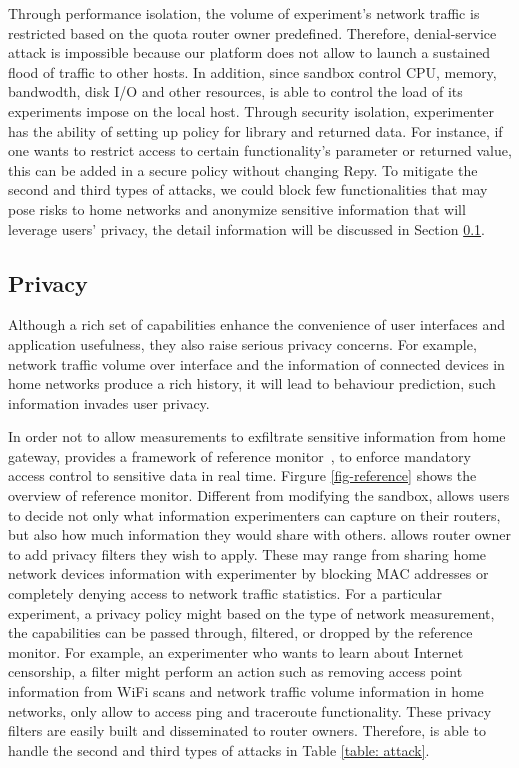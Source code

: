 Through performance isolation, the volume of experiment's network traffic is restricted based on the quota router owner predefined. Therefore, denial-service attack is impossible because our platform does not allow to launch a sustained flood of traffic to other hosts. In addition, since sandbox control CPU, memory, bandwodth, disk I/O and other resources, \sysname is able to control the load of its experiments impose on the local host. Through security isolation, experimenter has the ability of setting up policy for library and returned data. For instance, if one wants to restrict access to certain functionality's parameter or returned value, this can be added in a secure policy without changing Repy. To mitigate the second and third types of attacks, we could block few functionalities that may pose risks to home networks and anonymize sensitive information that will leverage users' privacy, the detail information will be discussed in Section \ref{sec.privacy}. 

\subsection{Privacy}
\label{sec.privacy}
Although a rich set of capabilities enhance the convenience of user interfaces and application usefulness, they also raise serious privacy concerns. For example, network traffic volume over interface and the information of connected devices in home networks produce a rich history, it will lead to behaviour prediction, such information invades user privacy. 

In order not to allow measurements to exfiltrate sensitive information from home gateway, \sysname provides a framework of reference monitor~\cite{ref}, to enforce mandatory access control to sensitive data in real time. Firgure \ref{fig-reference} shows the overview of reference monitor. Different from modifying the sandbox, \sysname allows users to decide not only what information experimenters can capture on their routers, but also how much information they would share with others. \sysname allows router owner to add privacy filters they wish to apply. These may range from sharing home network devices information with experimenter by blocking MAC addresses or completely denying access to network traffic statistics. For a particular experiment, a privacy policy might based on the type of network measurement, the capabilities can be passed through, filtered, or dropped by the reference monitor. For example, an experimenter who wants to learn about Internet censorship, a filter might perform an action such as removing access point information from WiFi scans and network traffic volume information in home networks, only allow to access ping and traceroute functionality. These privacy filters are easily built and disseminated to router owners. Therefore, \sysname is able to handle the second and third types of attacks in Table \ref{table: attack}. 

